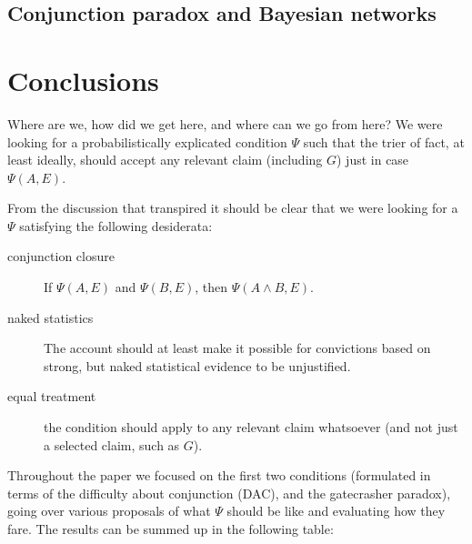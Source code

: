 \documentclass[10pt,dvipsnames,enabledeprecatedfontcommands]{scrartcl}
\newcommand{\et}{\wedge}
\begin{document}
\hypertarget{conjunction-paradox-and-bayesian-networks}{%
\subsection{Conjunction paradox and Bayesian
networks}\label{conjunction-paradox-and-bayesian-networks}}

\hypertarget{conclusions}{%
\section{Conclusions}\label{conclusions}}

Where are we, how did we get here, and where can we go from here? We
were looking for a probabilistically explicated condition \(\Psi\) such
that the trier of fact, at least ideally, should accept any relevant
claim (including \(G\)) just in case \(\Psi(A,E)\).

From the discussion that transpired it should be clear that we were
looking for a \(\Psi\) satisfying the following desiderata:

\begin{description}
\item[conjunction closure] If $\Psi(A,E)$ and $\Psi(B,E)$, then $\Psi(A\et B,E)$.
\item[naked statistics] The account should at least make it possible for convictions based on strong, but naked statistical evidence to be unjustified. 
\item[equal treatment] the condition should apply to any relevant claim whatsoever (and not just a selected claim, such as $G$).
\end{description}

Throughout the paper we focused on the first two conditions (formulated
in terms of the difficulty about conjunction (DAC), and the gatecrasher
paradox), going over various proposals of what \(\Psi\) should be like
and evaluating how they fare. The results can be summed up in the
following table:
\end{document}
